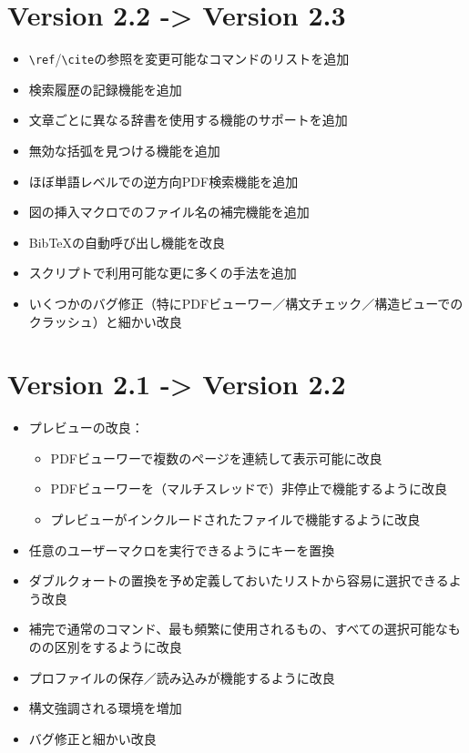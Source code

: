 \section{Version 2.2 -\textgreater{} Version 2.3}

\begin{itemize}
\item
  \verb+\ref+/\verb+\cite+の参照を変更可能なコマンドのリストを追加
\item
  検索履歴の記録機能を追加
\item
  文章ごとに異なる辞書を使用する機能のサポートを追加
\item
  無効な括弧を見つける機能を追加
\item
  ほぼ単語レベルでの逆方向PDF検索機能を追加
\item
  図の挿入マクロでのファイル名の補完機能を追加
\item
  BibTeXの自動呼び出し機能を改良
\item
  スクリプトで利用可能な更に多くの手法を追加
\item
  いくつかのバグ修正（特にPDFビューワー／構文チェック／構造ビューでのクラッシュ）と細かい改良
\end{itemize}

\section{Version 2.1 -\textgreater{} Version 2.2}

\begin{itemize}
\item
  プレビューの改良：

  \begin{itemize}
  \item
    PDFビューワーで複数のページを連続して表示可能に改良
  \item
    PDFビューワーを（マルチスレッドで）非停止で機能するように改良
  \item
    プレビューがインクルードされたファイルで機能するように改良
  \end{itemize}
\item
  任意のユーザーマクロを実行できるようにキーを置換
\item
  ダブルクォートの置換を予め定義しておいたリストから容易に選択できるよう改良
\item
  補完で通常のコマンド、最も頻繁に使用されるもの、すべての選択可能なものの区別をするように改良
\item
  プロファイルの保存／読み込みが機能するように改良
\item
  構文強調される環境を増加
\item
  バグ修正と細かい改良
\end{itemize}

